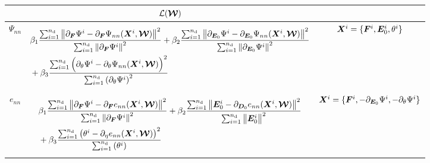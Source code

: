 \begin{table}[htbp!]
	\centering
	\begin{tabular}{c c c}
		\toprule
		\rowcolor{gray!30}	\small{} & $\mathcal{L}(\boldsymbol{\mathcal{W}})$ &\\
		\midrule
 $\Psi_{nn}$	&	\begin{minipage}{0.72\textwidth}
			\begin{equation*}
			\begin{aligned}
			& \beta_1\frac{\sum_{i=1}^{n_{\text{d}}} \left\| \partial_{\boldsymbol{F}}\Psi^{i} - \partial_{\boldsymbol{F}} \Psi_{nn}(\boldsymbol{X}^i, \boldsymbol{\mathcal{W}}) \right\|^2}{\sum_{i=1}^{n_{\text{d}}} \left\| \partial_{\boldsymbol{F}}\Psi^{i} \right\|^2}  + \beta_2\frac{\sum_{i=1}^{n_{\text{d}}} \left\| \partial_{\boldsymbol{E}_0}\Psi^{i} - \partial_{\boldsymbol{E}_0} \Psi_{nn}(\boldsymbol{X}^i, \boldsymbol{\mathcal{W}}) \right\|^2}{\sum_{i=1}^{n_{\text{d}}} \left\| \partial_{\boldsymbol{E}_0}\Psi^{i} \right\|^2} \\
			& + \beta_3\frac{\sum_{i=1}^{n_{\text{d}}} \Big( \partial_{\theta}\Psi^{i} - \partial_{\theta} \Psi_{nn}(\boldsymbol{X}^i, \boldsymbol{\mathcal{W}}) \Big)^2}{\sum_{i=1}^{n_{\text{d}}} \left( \partial_{\theta}\Psi^{i} \right)^2}
			\end{aligned}
			\end{equation*}
		\end{minipage}  & $\boldsymbol{X}^i=\{\boldsymbol{F}^i, \boldsymbol{E}_0^i, \theta^i\}$ \\
		\midrule
 $e_{nn}$	&	\begin{minipage}{0.72\textwidth}
			\begin{equation*}
			\begin{aligned}
			& \beta_1\frac{\sum_{i=1}^{n_{\text{d}}} \left\| \partial_{\boldsymbol{F}}\Psi^{i} - \partial_{\boldsymbol{F}} e_{nn}(\boldsymbol{X}^i, \boldsymbol{\mathcal{W}}) \right\|^2}{\sum_{i=1}^{n_{\text{d}}} \left\| \partial_{\boldsymbol{F}}\Psi^{i} \right\|^2}  + \beta_2\frac{\sum_{i=1}^{n_{\text{d}}} \left\| \boldsymbol{E}_0^{i} - \partial_{\boldsymbol{D}_0} e_{nn}(\boldsymbol{X}^i, \boldsymbol{\mathcal{W}}) \right\|^2}{\sum_{i=1}^{n_{\text{d}}} \left\| \boldsymbol{E}_0^{i} \right\|^2} \\
			& + \beta_3\frac{\sum_{i=1}^{n_{\text{d}}} \left( \theta^{i} - \partial_{\eta} e_{nn}(\boldsymbol{X}^i, \boldsymbol{\mathcal{W}}) \right)^2}{\sum_{i=1}^{n_{\text{d}}} \left( \theta^{i} \right)}
			\end{aligned}
			\end{equation*}
		\end{minipage}  & $\boldsymbol{X}^i=\{\boldsymbol{F}^i, -\partial_{\boldsymbol{E}_0}\Psi^i, -\partial_{\theta}\Psi^i\}$ 	\\

\end{tabular}
\end{table}
